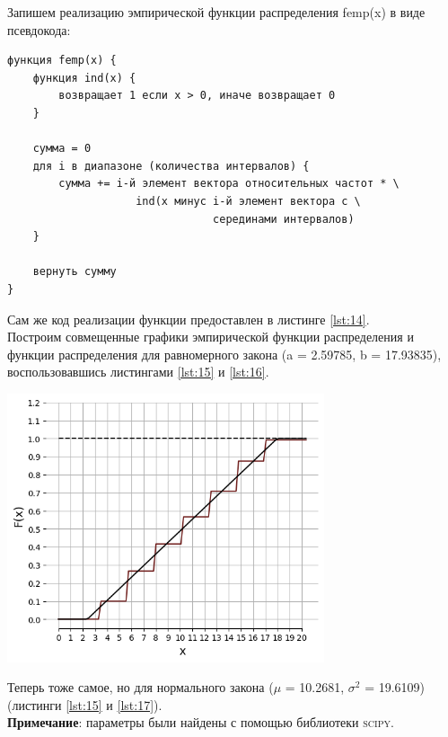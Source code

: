 \documentclass[a4paper, 14pt]{extarticle}
\begin{document}
Запишем реализацию эмпирической функции распределения femp(x) в виде 
псевдокода:

\begin{tcolorbox}[colback=gray!10, colframe=gray!50, title=Псевдокод функции femp]
    \begin{verbatim}
функция femp(x) {
    функция ind(x) {
        возвращает 1 если x > 0, иначе возвращает 0
    }

    сумма = 0
    для i в диапазоне (количества интервалов) {
        сумма += i-й элемент вектора относительных частот * \ 
                    ind(x минус i-й элемент вектора с \
                                серединами интервалов)
    }

    вернуть сумму
}      
    \end{verbatim}
\end{tcolorbox}

Сам же код реализации функции предоставлен в листинге \ref{lst:14}.\\

Построим совмещенные графики эмпирической функции распределения и 
функции распределения для равномерного закона (a = 2.59785, b = 17.93835), 
воспользовавшись 
листингами \ref{lst:15} и \ref{lst:16}.

\begin{center}
    \includegraphics[width=0.7\textwidth]{LW1_31_0}
\end{center}

Теперь тоже самое, но для нормального закона ($\mu$ = 10.2681, $\sigma^2$ = 19.6109) 
(листинги \ref{lst:15} и \ref{lst:17}).\\
{ \footnotesize \textbf{Примечание}: параметры были найдены с помощью библиотеки 
\textsc{scipy}}.
\end{document}
